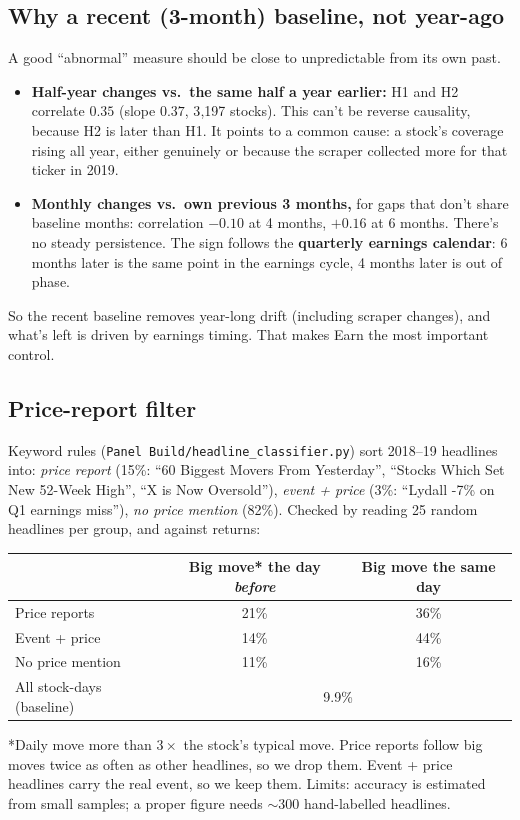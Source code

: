 \documentclass[11pt]{article}
\newcommand{\var}[1]{\texttt{#1}}
\begin{document}
\subsection{Why a recent (3-month) baseline, not year-ago}\label{sec:earn}
A good ``abnormal'' measure should be close to unpredictable from its own past.
\begin{itemize}
  \item \textbf{Half-year changes vs.\ the same half a year earlier:} H1 and H2 correlate $0.35$ (slope $0.37$, 3{,}197 stocks). This can't be reverse causality, because H2 is later than H1. It points to a common cause: a stock's coverage rising all year, either genuinely or because the scraper collected more for that ticker in 2019.
  \item \textbf{Monthly changes vs.\ own previous 3 months,} for gaps that don't share baseline months: correlation $-0.10$ at 4 months, $+0.16$ at 6 months. There's no steady persistence. The sign follows the \textbf{quarterly earnings calendar}: 6 months later is the same point in the earnings cycle, 4 months later is out of phase.
\end{itemize}
So the recent baseline removes year-long drift (including scraper changes), and what's left is driven by earnings timing. That makes Earn the most important control.

\subsection{Price-report filter}\label{sec:filter}
Keyword rules (\var{Panel Build/headline\_classifier.py}) sort 2018--19 headlines into: \emph{price report} (15\%: ``60 Biggest Movers From Yesterday'', ``Stocks Which Set New 52-Week High'', ``X is Now Oversold''), \emph{event + price} (3\%: ``Lydall -7\% on Q1 earnings miss''), \emph{no price mention} (82\%). Checked by reading 25 random headlines per group, and against returns:

\begin{center}\small
\begin{tabular}{lcc}
\toprule
 & Big move* the day \emph{before} & Big move the same day\\
\midrule
Price reports & 21\% & 36\%\\
Event + price & 14\% & 44\%\\
No price mention & 11\% & 16\%\\
All stock-days (baseline) & \multicolumn{2}{c}{9.9\%}\\
\bottomrule
\end{tabular}
\end{center}
*Daily move more than $3\times$ the stock's typical move. Price reports follow big moves twice as often as other headlines, so we drop them. Event + price headlines carry the real event, so we keep them. Limits: accuracy is estimated from small samples; a proper figure needs $\sim$300 hand-labelled headlines.
\end{document}
